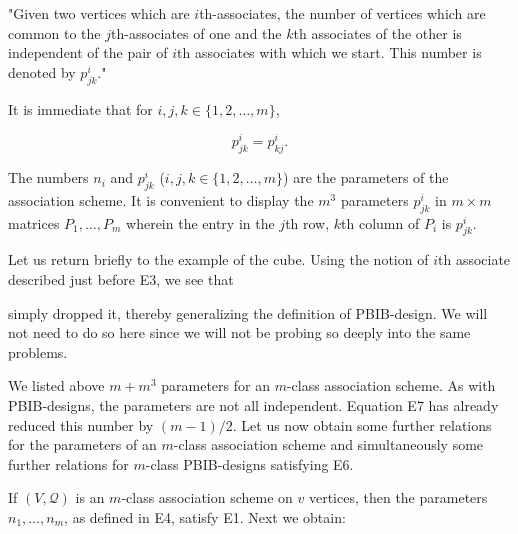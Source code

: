 "Given two vertices which are $i$th-associates, the number of vertices which are common to the $j$th-associates of one and the $k$th associates of the other is independent of the pair of $i$th associates with which we start. This number is denoted by $p_{jk}^i$."

It is immediate that for $i, j, k \in \{1, 2, \ldots, m\}$,

$$p_{jk}^i = p_{kj}^i.$$

The numbers $n_i$ and $p_{jk}^i$ ($i, j, k \in \{1, 2, \ldots, m\}$) are the parameters of the association scheme. It is convenient to display the $m^3$ parameters $p_{jk}^i$ in $m \times m$ matrices $P_1, \ldots, P_m$ wherein the entry in the $j$th row, $k$th column of $P_i$ is $p_{jk}^i$.

Let us return briefly to the example of the cube. Using the notion of $i$th associate described just before E3, we see that

simply dropped it, thereby generalizing the definition of PBIB-design. We will not need to do so here since we will not be probing so deeply into the same problems.

We listed above $m + m^3$ parameters for an $m$-class association scheme. As with PBIB-designs, the parameters are not all independent. Equation E7 has already reduced this number by $(m-1)/2$. Let us now obtain some further relations for the parameters of an $m$-class association scheme and simultaneously some further relations for $m$-class PBIB-designs satisfying E6.

If $(V, \mathcal{Q})$ is an $m$-class association scheme on $v$ vertices, then the parameters $n_1, \ldots, n_m$, as defined in E4, satisfy E1. Next we obtain:
